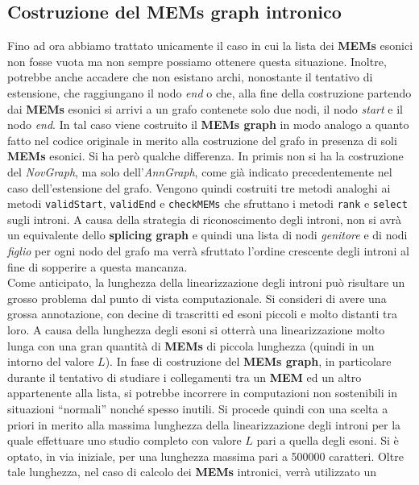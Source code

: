 \documentclass[a4paper,12pt, oneside]{book}
\begin{document}
\subsection{Costruzione del MEMs graph intronico}
Fino ad ora abbiamo trattato unicamente il caso in cui la lista dei
\textbf{MEMs} 
esonici non fosse vuota ma non sempre possiamo ottenere questa
situazione. Inoltre, potrebbe anche accadere che non esistano archi, nonostante
il tentativo di estensione, che raggiungano il nodo \textit{end} o che, alla
fine della costruzione partendo dai \textbf{MEMs} esonici si arrivi a un grafo
contenete solo due nodi, il nodo \textit{start} e il nodo \textit{end}. In tal
caso viene costruito il \textbf{MEMs graph} in modo analogo a quanto fatto nel
codice originale in merito alla costruzione del grafo in presenza di soli
\textbf{MEMs} esonici. Si ha però qualche differenza. In primis non si ha la
costruzione del \textit{NovGraph}, ma solo dell'\textit{AnnGraph}, come già
indicato precedentemente nel caso dell'estensione del grafo. Vengono quindi
costruiti tre metodi analoghi ai metodi \texttt{validStart}, \texttt{validEnd} e
\texttt{checkMEMs} che sfruttano i metodi \texttt{rank} e \texttt{select} sugli
introni. A causa della strategia di riconoscimento degli introni, non si avrà un
equivalente dello \textbf{splicing graph} e quindi una lista di nodi
\textit{genitore} e di nodi \textit{figlio} per ogni nodo del grafo ma verrà
sfruttato l'ordine crescente degli introni al fine di sopperire a questa
mancanza.\\
Come anticipato, la lunghezza della linearizzazione degli introni può risultare
 un grosso problema dal punto di vista computazionale. Si consideri di avere
una grossa annotazione, con decine di trascritti ed esoni piccoli e molto
distanti tra loro. A causa della lunghezza degli esoni si otterrà una
linearizzazione molto lunga con una gran quantità di \textbf{MEMs} di piccola
lunghezza (quindi in un intorno del valore $L$). In fase di costruzione del
\textbf{MEMs graph}, in particolare durante il tentativo di studiare i
collegamenti tra un \textbf{MEM} ed un altro appartenente alla lista,
si potrebbe incorrere in computazioni non sostenibili in situazioni ``normali''
nonché spesso inutili. Si procede quindi con una scelta a priori in merito alla
massima lunghezza della linearizzazione degli introni per la quale effettuare
uno studio completo con valore $L$ pari a quella degli esoni. Si è optato, in
via iniziale, per una lunghezza massima pari a 500000 caratteri. Oltre tale
lunghezza, nel caso di calcolo dei \textbf{MEMs} intronici, verrà utilizzato un
\end{document}
